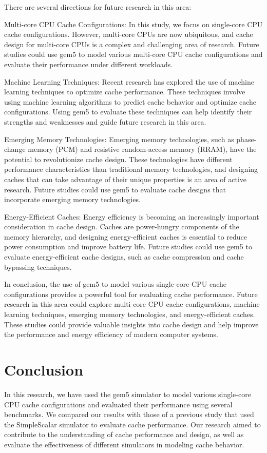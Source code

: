 \documentclass[conference]{IEEEtran}
\begin{document}
There are several directions for future research in this area:

Multi-core CPU Cache Configurations: In this study, we focus on single-core CPU cache configurations. However, multi-core CPUs are now ubiquitous, and cache design for multi-core CPUs is a complex and challenging area of research. Future studies could use gem5 to model various multi-core CPU cache configurations and evaluate their performance under different workloads.

Machine Learning Techniques: Recent research has explored the use of machine learning techniques to optimize cache performance. These techniques involve using machine learning algorithms to predict cache behavior and optimize cache configurations. Using gem5 to evaluate these techniques can help identify their strengths and weaknesses and guide future research in this area.

Emerging Memory Technologies: Emerging memory technologies, such as phase-change memory (PCM) and resistive random-access memory (RRAM), have the potential to revolutionize cache design. These technologies have different performance characteristics than traditional memory technologies, and designing caches that can take advantage of their unique properties is an area of active research. Future studies could use gem5 to evaluate cache designs that incorporate emerging memory technologies.

Energy-Efficient Caches: Energy efficiency is becoming an increasingly important consideration in cache design. Caches are power-hungry components of the memory hierarchy, and designing energy-efficient caches is essential to reduce power consumption and improve battery life. Future studies could use gem5 to evaluate energy-efficient cache designs, such as cache compression and cache bypassing techniques.

In conclusion, the use of gem5 to model various single-core CPU cache configurations provides a powerful tool for evaluating cache performance. Future research in this area could explore multi-core CPU cache configurations, machine learning techniques, emerging memory technologies, and energy-efficient caches. These studies could provide valuable insights into cache design and help improve the performance and energy efficiency of modern computer systems.

\section{Conclusion}
In this research, we have used the gem5 simulator to model various single-core CPU cache configurations and evaluated their performance using several benchmarks. We compared our results with those of a previous study that used the SimpleScalar simulator to evaluate cache performance. Our research aimed to contribute to the understanding of cache performance and design, as well as evaluate the effectiveness of different simulators in modeling cache behavior.
\end{document}
